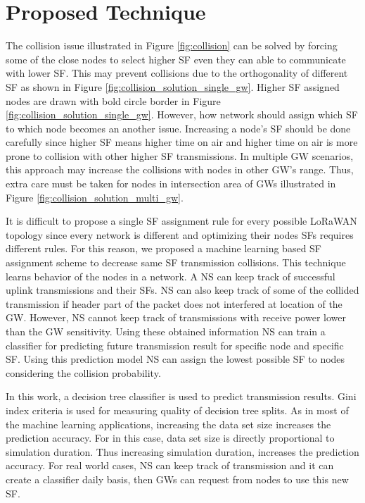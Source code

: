 \documentclass[conference]{IEEEtran}
\begin{document}
\section{Proposed Technique} \label{Proposed Technique}
\par The collision issue illustrated in Figure \ref{fig:collision} can be solved by forcing some of the close nodes to select higher SF even they can able to communicate with lower SF. This may prevent collisions due to the orthogonality of different SF as shown in Figure \ref{fig:collision_solution_single_gw}. Higher SF assigned nodes are drawn with bold circle border in Figure \ref{fig:collision_solution_single_gw}. However, how network should assign which SF to which node becomes an another issue. Increasing a node's SF should be done carefully since higher SF means higher time on air and higher time on air is more prone to collision with other higher SF transmissions. In multiple GW scenarios, this approach may increase the collisions with nodes in other GW's range. Thus, extra care must be taken for nodes in intersection area of GWs illustrated in Figure \ref{fig:collision_solution_multi_gw}.

\par It is difficult to propose a single SF assignment rule for every possible LoRaWAN topology since every network is different and optimizing their nodes SFs requires different rules. For this reason, we proposed a machine learning based SF assignment scheme to decrease same SF transmission collisions. This technique learns behavior of the nodes in a network. A NS can keep track of successful uplink transmissions and their SFs. NS can also keep track of some of the collided transmission if header part of the packet does not interfered at location of the GW. However, NS cannot keep track of transmissions with receive power lower than the GW sensitivity. Using these obtained information NS can train a classifier for predicting future transmission result for specific node and specific SF. Using this prediction model NS can assign the lowest possible SF to nodes considering the collision probability.

\par In this work, a decision tree classifier is used to predict transmission results. Gini index criteria is used for measuring quality of decision tree splits. As in most of the machine learning applications, increasing the data set size increases the prediction accuracy. For in this case, data set size is directly proportional to simulation duration. Thus increasing simulation duration, increases the prediction accuracy. For real world cases, NS can keep track of transmission and it can create a classifier daily basis, then GWs can request from nodes to use this new SF.
\end{document}
